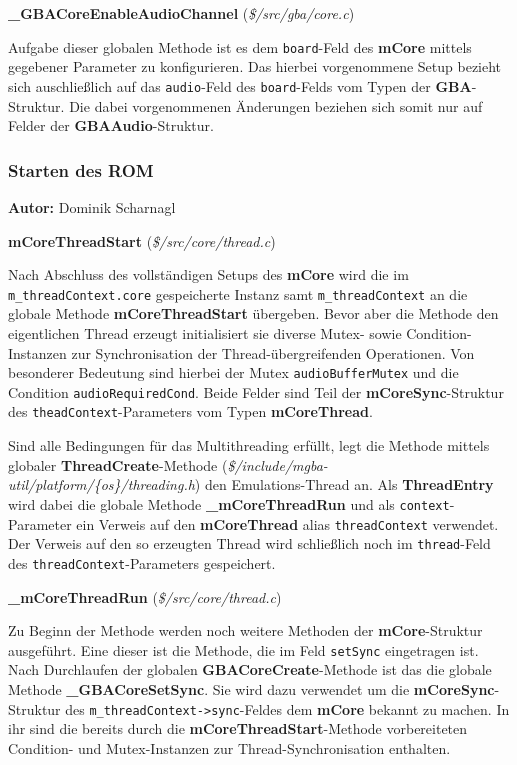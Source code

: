 \documentclass[11pt,a4paper]{scrartcl}
\newcommand{\AutorDominik} {
    \vspace{-4mm}
    \large \textbf{Autor:} Dominik Scharnagl \normalsize
    \vspace{2mm}
}
\newcommand{\paratitlecode}[2] {
    \vspace{5mm}
    \large \textbf{#1} \normalsize(\textit{\${#2}})
    \vspace{2mm}\newline
}
\begin{document}
\paratitlecode{{\_}GBACoreEnableAudioChannel}{/src/gba/core.c}
Aufgabe dieser globalen Methode ist es dem \verb|board|-Feld des \textbf{mCore} mittels gegebener Parameter zu konfigurieren. Das hierbei vorgenommene Setup bezieht sich auschlie{\ss}lich auf das \verb|audio|-Feld des \verb|board|-Felds vom Typen der \textbf{GBA}-Struktur. Die dabei vorgenommenen \"Anderungen beziehen sich somit nur auf Felder der \textbf{GBAAudio}-Struktur.


\newpage
\subsubsection{Starten des ROM}
\AutorDominik

\paratitlecode{mCoreThreadStart}{/src/core/thread.c}
Nach Abschluss des vollst\"andigen Setups des \textbf{mCore} wird die im \verb|m_threadContext.core| gespeicherte Instanz samt \verb|m_threadContext| an die globale Methode \textbf{mCoreThreadStart} \"ubergeben. Bevor aber die Methode den eigentlichen Thread erzeugt initialisiert sie diverse Mutex- sowie Condition-Instanzen zur Synchronisation der Thread-\"ubergreifenden Operationen. Von besonderer Bedeutung sind hierbei der Mutex \verb|audioBufferMutex| und die Condition \verb|audioRequiredCond|. Beide Felder sind Teil der \textbf{mCoreSync}-Struktur des \verb|theadContext|-Parameters vom Typen \textbf{mCoreThread}.

Sind alle Bedingungen f\"ur das Multithreading erf\"ullt, legt die Methode mittels globaler \textbf{ThreadCreate}-Methode (\textit{\$/include/mgba-util/platform/\{os\}/threading.h}) den Emulations-Thread an. Als \textbf{ThreadEntry} wird dabei die globale Methode \textbf{{\_}mCoreThreadRun} und als \verb|context|-Parameter ein Verweis auf den \textbf{mCoreThread} alias \verb|threadContext| verwendet. Der Verweis auf den so erzeugten Thread wird schlie{\ss}lich noch im \verb|thread|-Feld des \verb|threadContext|-Parameters gespeichert.

\paratitlecode{{\_}mCoreThreadRun}{/src/core/thread.c}
Zu Beginn der Methode werden noch weitere Methoden der \textbf{mCore}-Struktur ausgef\"uhrt. Eine dieser ist die Methode, die im Feld \verb|setSync| eingetragen ist. Nach Durchlaufen der globalen \textbf{GBACoreCreate}-Methode ist das die globale Methode \textbf{{\_}GBACoreSetSync}. Sie wird dazu verwendet um die \textbf{mCoreSync}-Struktur des \verb|m_threadContext->sync|-Feldes dem \textbf{mCore} bekannt zu machen. In ihr sind die bereits durch die \textbf{mCoreThreadStart}-Methode vorbereiteten Condition- und Mutex-Instanzen zur Thread-Synchronisation enthalten.
\end{document}
